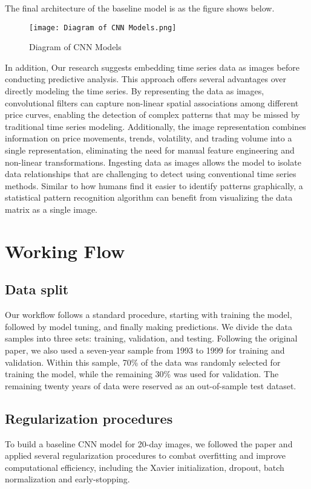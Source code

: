 \documentclass{article}
\begin{document}
The final architecture of the baseline model is as the figure shows below.

\begin{figure}[H]
	\centering
	\texttt{[image: Diagram of CNN Models.png]}
	\caption{ Diagram of CNN Models }
\end{figure}

In addition, Our research suggests embedding time series data as images before conducting predictive analysis. This approach offers several advantages over directly modeling the time series. By representing the data as images, convolutional filters can capture non-linear spatial associations among different price curves, enabling the detection of complex patterns that may be missed by traditional time series modeling. Additionally, the image representation combines information on price movements, trends, volatility, and trading volume into a single representation, eliminating the need for manual feature engineering and non-linear transformations. Ingesting data as images allows the model to isolate data relationships that are challenging to detect using conventional time series methods. Similar to how humans find it easier to identify patterns graphically, a statistical pattern recognition algorithm can benefit from visualizing the data matrix as a single image.

\section{Working Flow}

\subsection{Data split}
Our workflow follows a standard procedure, starting with training the model, followed by model tuning, and finally making predictions. We divide the data samples into three sets: training, validation, and testing. Following the original paper, we also used a seven-year sample from 1993 to 1999 for training and validation. Within this sample, 70\% of the data was randomly selected for training the model, while the remaining 30\% was used for validation. The remaining twenty years of data were reserved as an out-of-sample test dataset.

\subsection{Regularization procedures}
To build a baseline CNN model for 20-day images, we followed the paper and applied several regularization procedures to combat overfitting and improve computational efficiency, including the Xavier initialization, dropout, batch normalization and early-stopping.
\end{document}
